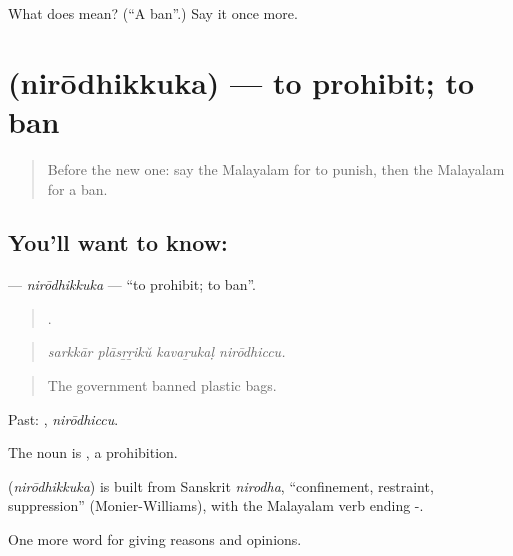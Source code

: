 \begin{tcolorbox}[breakable,colback=teal!4,colframe=teal!35!black,title={Before you move on}]
What does  mean? (\textquotedblleft{}A ban\textquotedblright{}.) Say it once more.
\end{tcolorbox}
\section[\texorpdfstring{\ml{നിരോധിക്കുക} (nirōdhikkuka)}{നിരോധിക്കുക (nirōdhikkuka)}]{ (nirōdhikkuka) — to prohibit; to ban}

\label{lesson:ML-C418-nirodhikkuka}



\begin{quote}
Before the new one: say the Malayalam for to punish, then the Malayalam for a ban.
\end{quote}

\subsection*{You'll want to know: }
\textbf{} — \emph{nirōdhikkuka} — \textquotedblleft{}to prohibit; to ban\textquotedblright{}.

\begin{quote}
   .
\end{quote}

\begin{quote}
\emph{sarkkār plāsṟṟikŭ kavaṟukaḷ nirōdhiccu.}
\end{quote}

\begin{quote}
The government banned plastic bags.
\end{quote}

Past: , \emph{nirōdhiccu}.

The noun is , a prohibition.

\begin{cousinweb}
\textbf{} (\emph{nirōdhikkuka}) is built from Sanskrit \emph{nirodha}, \textquotedblleft{}confinement, restraint, suppression\textquotedblright{} (Monier-Williams), with the Malayalam verb ending -.
\end{cousinweb}

\begin{grammarlens}[title={What you've built}]
One more word for giving reasons and opinions.
\end{grammarlens}

